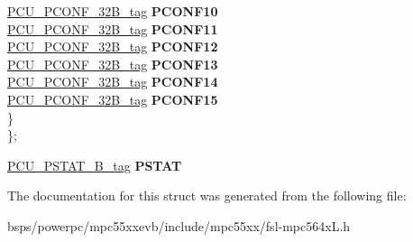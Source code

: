 \begin{DoxyCompactItemize}
\begin{tabbing}
\>\>\mbox{\hyperlink{unionPCU__PCONF__32B__tag}{PCU\_PCONF\_32B\_tag}} {\bfseries PCONF10}\\
\>\>\mbox{\hyperlink{unionPCU__PCONF__32B__tag}{PCU\_PCONF\_32B\_tag}} {\bfseries PCONF11}\\
\>\>\mbox{\hyperlink{unionPCU__PCONF__32B__tag}{PCU\_PCONF\_32B\_tag}} {\bfseries PCONF12}\\
\>\>\mbox{\hyperlink{unionPCU__PCONF__32B__tag}{PCU\_PCONF\_32B\_tag}} {\bfseries PCONF13}\\
\>\>\mbox{\hyperlink{unionPCU__PCONF__32B__tag}{PCU\_PCONF\_32B\_tag}} {\bfseries PCONF14}\\
\>\>\mbox{\hyperlink{unionPCU__PCONF__32B__tag}{PCU\_PCONF\_32B\_tag}} {\bfseries PCONF15}\\
\>\} \\
\}; \\

\end{tabbing}\item 
\mbox{\label{structPCU__struct__tag_a7cc49f529fe33033301b65ba3c3e19b3}} 
\mbox{\hyperlink{unionPCU__PSTAT__32B__tag}{P\+C\+U\+\_\+\+P\+S\+T\+A\+T\+\_\+B\+\_\+tag}} {\bfseries P\+S\+T\+AT}
\end{DoxyCompactItemize}


The documentation for this struct was generated from the following file\+:\begin{DoxyCompactItemize}
\item 
bsps/powerpc/mpc55xxevb/include/mpc55xx/fsl-\/mpc564x\+L.\+h\end{DoxyCompactItemize}
